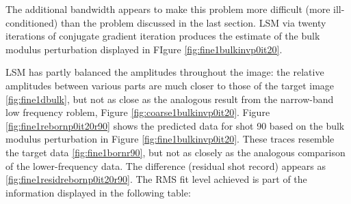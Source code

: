 
The additional bandwidth appears to make this problem more difficult
(more ill-conditioned) than the problem discussed in the last section.
LSM via twenty iterations of conjugate gradient iteration
produces the estimate of the bulk modulus perturbation displayed in
FIgure \ref{fig:fine1bulkinvp0it20}.


LSM has partly balanced the amplitudes throughout the image: the
relative amplitudes between various parts are much closer to those of
the target image \ref{fig:fine1dbulk}, but not as close as the
analogous result from the narrow-band low frequency roblem, Figure
\ref{fig:coarse1bulkinvp0it20}. Figure
\ref{fig:fine1rebornp0it20r90} shows the predicted data for
shot 90 based on the bulk modulus perturbation in Figure
\ref{fig:fine1bulkinvp0it20}. These traces resemble
the target data \ref{fig:fine1bornr90}, but not as closely as the
analogous comparison of the lower-frequency data. The difference (residual
shot record) appears as \ref{fig:fine1residrebornp0it20r90}. The RMS
fit level achieved is part of the information displayed in the
following table:

